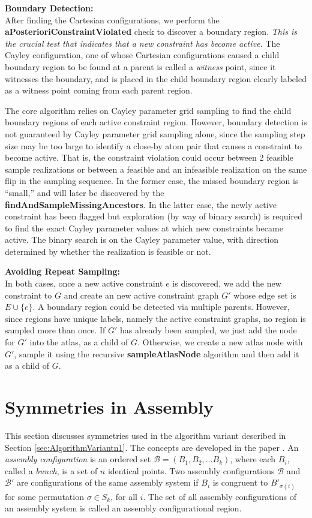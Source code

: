 \documentclass[]{article}
\begin{document}
\noindent\textbf{Boundary Detection:\\}
After finding the Cartesian configurations, we perform the
\textbf{aPosterioriConstraintViolated} check to discover a boundary region.
{\sl This is the crucial test that indicates that a new constraint has become
active.} The Cayley configuration, one of whose Cartesian configurations caused a child boundary region to
be found at a parent is called a \emph{witness} point, since it witnesses the
boundary, and is placed in the child boundary region clearly labeled as a
witness point coming from each parent region. 

The core algorithm relies on Cayley parameter grid sampling to find the child boundary
regions of each active constraint region. However, boundary detection is not
guaranteed by Cayley parameter grid sampling alone, since the sampling step
size may be too large to identify a close-by atom pair that causes a 
constraint to become active. That is, the constraint violation could occur between 2
feasible sample realizations or between a feasible and an infeasible
realization on the same flip in the sampling sequence. In the former case, the
missed boundary region is ``small,'' and will later be discovered by
the {\bf findAndSampleMissingAncestors}. In the latter case, the newly active
constraint has been flagged but exploration (by way of binary search) is
required to find the exact Cayley parameter values at which new constraints
became active. The binary search is on the Cayley parameter value, with
direction determined by whether the realization is feasible or not.

\noindent \textbf{Avoiding Repeat Sampling:\\}
In both cases, once a new active constraint $e$ is discovered, we add the new
constraint to $G$ and create an new active constraint graph $G'$ whose 
edge set is ${E \cup \{e\}}$. A boundary region could be detected via multiple parents.
However, since regions have unique labels, namely the active constraint graphs,
no region is sampled more than once. If $G'$ has already been sampled, we just
add the node for $G'$ into the atlas, as a child of $G$. Otherwise, we create
a new atlas node with $G'$, sample it using the recursive
\textbf{sampleAtlasNode} algorithm and then add it as a child of $G$.  


\section{Symmetries in Assembly}
\label{sec:app:symmetries}
This section discusses symmetries used in the algorithm variant
described in Section \ref{sec:AlgorithmVariantn1}.
The concepts are developed in the paper \cite{sym8010005}.
An \emph{assembly configuration} is an ordered set $\mathcal{B} = (B_1, B_2,
\dots B_k)$, where each $B_i$, called a \emph{bunch}, is a set of $n$ identical
points. Two assembly configurations $\mathcal{B}$ and $\mathcal{B}'$ are
configurations of the same assembly system if $B_i$ is congruent to
$B'_{\sigma(i)}$ for some permutation $\sigma \in S_k$, for all $i$.  The set
of all assembly configurations of an assembly system is called an assembly
configurational region.
\end{document}
